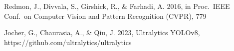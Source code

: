     Redmon, J., Divvala, S., Girshick, R., \& Farhadi, A. 2016,
       in Proc.\ IEEE Conf.\ on Computer Vision and Pattern Recognition (CVPR), 779

    Jocher, G., Chaurasia, A., \& Qiu, J. 2023,
       Ultralytics YOLOv8, https://github.com/ultralytics/ultralytics
